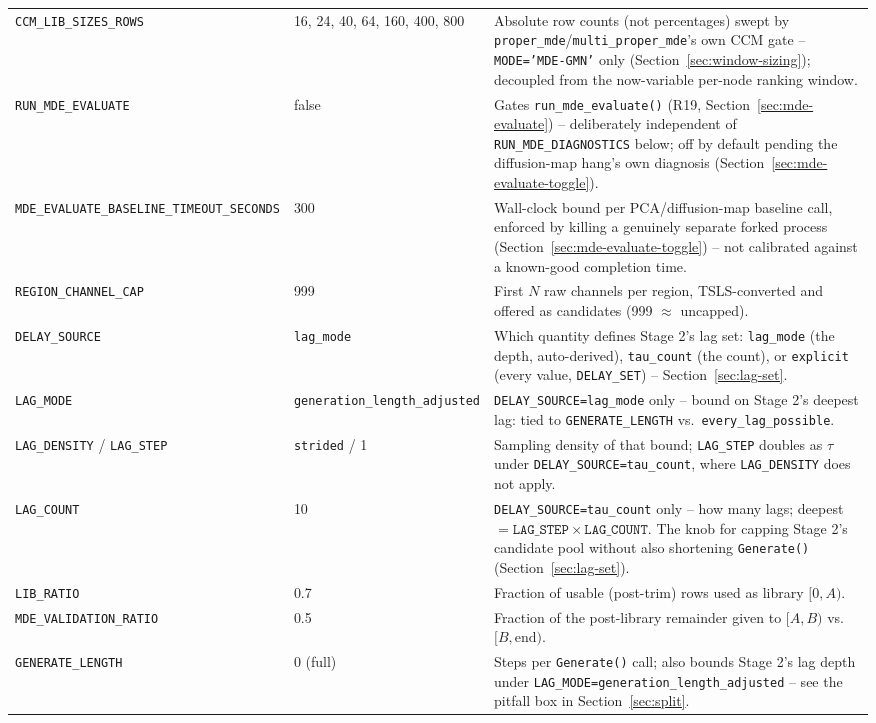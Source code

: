 \documentclass[11pt]{article}
\begin{document}
\begin{longtable}{@{}>{\raggedright\arraybackslash}p{4.0cm}>{\raggedright\arraybackslash\small}p{2.6cm}>{\raggedright\arraybackslash}p{7.9cm}@{}}
\texttt{CCM\_LIB\_SIZES\_ROWS} & 16, 24, 40, 64, 160, 400, 800 & Absolute row counts (not percentages) swept by \texttt{proper\_mde}/\texttt{multi\_proper\_mde}'s own CCM gate -- \texttt{MODE='MDE-GMN'} only (Section~\ref{sec:window-sizing}); decoupled from the now-variable per-node ranking window. \\
\texttt{RUN\_MDE\_EVALUATE} & false & Gates \texttt{run\_mde\_evaluate()} (R19, Section~\ref{sec:mde-evaluate}) -- deliberately independent of \texttt{RUN\_MDE\_DIAGNOSTICS} below; off by default pending the diffusion-map hang's own diagnosis (Section~\ref{sec:mde-evaluate-toggle}). \\
\texttt{MDE\_EVALUATE\_BASELINE\_TIMEOUT\_SECONDS} & 300 & Wall-clock bound per PCA/diffusion-map baseline call, enforced by killing a genuinely separate forked process (Section~\ref{sec:mde-evaluate-toggle}) -- not calibrated against a known-good completion time. \\
\texttt{REGION\_CHANNEL\_CAP} & 999 & First $N$ raw channels per region, TSLS-converted and offered as candidates (999 $\approx$ uncapped). \\
\texttt{DELAY\_SOURCE} & \texttt{lag\_mode} & Which quantity defines Stage 2's lag set: \texttt{lag\_mode} (the depth, auto-derived), \texttt{tau\_count} (the count), or \texttt{explicit} (every value, \texttt{DELAY\_SET}) -- Section~\ref{sec:lag-set}. \\
\texttt{LAG\_MODE} & \texttt{generation\_length\_adjusted} & \texttt{DELAY\_SOURCE=lag\_mode} only -- bound on Stage 2's deepest lag: tied to \texttt{GENERATE\_LENGTH} vs.\ \texttt{every\_lag\_possible}. \\
\texttt{LAG\_DENSITY} / \texttt{LAG\_STEP} & \texttt{strided} / 1 & Sampling density of that bound; \texttt{LAG\_STEP} doubles as $\tau$ under \texttt{DELAY\_SOURCE=tau\_count}, where \texttt{LAG\_DENSITY} does not apply. \\
\texttt{LAG\_COUNT} & 10 & \texttt{DELAY\_SOURCE=tau\_count} only -- how many lags; deepest $= \texttt{LAG\_STEP} \times \texttt{LAG\_COUNT}$. The knob for capping Stage 2's candidate pool without also shortening \texttt{Generate()} (Section~\ref{sec:lag-set}). \\
\texttt{LIB\_RATIO} & 0.7 & Fraction of usable (post-trim) rows used as library $[0,A)$. \\
\texttt{MDE\_VALIDATION\_RATIO} & 0.5 & Fraction of the post-library remainder given to $[A,B)$ vs.\ $[B,\mathrm{end})$. \\
\texttt{GENERATE\_LENGTH} & 0 (full) & Steps per \texttt{Generate()} call; also bounds Stage 2's lag depth under \texttt{LAG\_MODE=generation\_length\_adjusted} -- see the pitfall box in Section~\ref{sec:split}. \\

\end{longtable}
\end{document}

